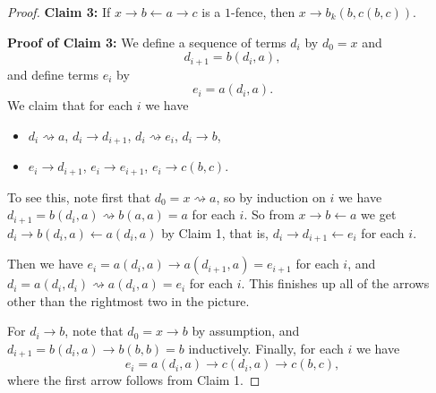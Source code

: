 \begin{appendices}
\begin{proof}
{\bf Claim 3:} If $x \rightarrow b \leftarrow a \rightarrow c$ is a $1$-fence, then $x \rightarrow b_k(b,c(b,c))$.

{\bf Proof of Claim 3:} We define a sequence of terms $d_i$ by $d_0 = x$ and
\[
d_{i+1} = b(d_i,a),
\]
and define terms $e_i$ by
\[
e_i = a(d_i,a).
\]
We claim that for each $i$ we have
\begin{itemize}
\item $d_i \rightsquigarrow a$, $d_i \rightarrow d_{i+1}$, $d_i\rightsquigarrow e_i$, $d_i \rightarrow b$,
\item $e_i\rightarrow d_{i+1}$, $e_i \rightarrow e_{i+1}$, $e_i \rightarrow c(b,c)$.
\end{itemize}
\begin{center}
\end{center}
To see this, note first that $d_0 = x \rightsquigarrow a$, so by induction on $i$ we have $d_{i+1} = b(d_i,a) \rightsquigarrow b(a,a) = a$ for each $i$. So from $x \rightarrow b \leftarrow a$ we get $d_i \rightarrow b(d_i,a) \leftarrow a(d_i,a)$ by Claim 1, that is, $d_i \rightarrow d_{i+1} \leftarrow e_i$ for each $i$.

Then we have $e_i = a(d_i,a) \rightarrow a(d_{i+1},a) = e_{i+1}$ for each $i$, and $d_i = a(d_i,d_i) \rightsquigarrow a(d_i,a) = e_i$ for each $i$. This finishes up all of the arrows other than the rightmost two in the picture.

For $d_i \rightarrow b$, note that $d_0 = x \rightarrow b$ by assumption, and $d_{i+1} = b(d_i,a) \rightarrow b(b,b) = b$ inductively. Finally, for each $i$ we have
\[
e_i = a(d_i,a) \rightarrow c(d_i,a) \rightarrow c(b,c),
\]
where the first arrow follows from Claim 1.


\end{proof}
\end{appendices}
